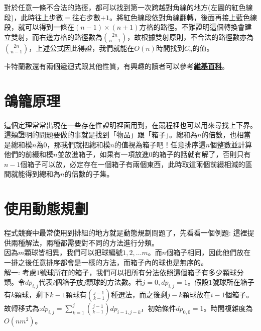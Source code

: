 \documentclass[main.tex]{subfiles}
\begin{document}
對於任意一條不合法的路徑，都可以找到第一次跨越對角線的地方(左圖的紅色線段)，此時往上步數$=$往右步數$+1$。將紅色線段依對角線翻轉，後面再接上藍色線段，就可以得到一條在$(n-1)\times(n+1)$方格的路徑。不難證明這個轉換會建立雙射，而右邊方格的路徑數為$\binom{2n}{n-1}$，故根據雙射原則，不合法的路徑數亦為$\binom{2n}{n-1}$，上述公式因此得證，我們就能在$O(n)$時間找到$C_n$的值。

卡特蘭數還有兩個遞迴式跟其他性質，有興趣的讀者可以參考\textbf{\href{https://en.wikipedia.org/wiki/Catalan_number}{維基百科}}。

\section{鴿籠原理}
這個定理常常出現在一些存在性證明裡面用到，在競程裡也可以用來尋找上下界。
\newpage
這類證明的問題要做的事就是找到「物品」跟「箱子」。總和為$n$的倍數，也相當是總和模$n$為$0$，那我們就把總和模$n$的值視為箱子吧！任意排序這$n$個整數並計算他們的前綴和模$n$並放進箱子，如果有一項放進$0$的箱子的話就有解了，否則只有$n-1$個箱子可以放，必定存在一個箱子有兩個東西，此時取這兩個前綴相減的區間就能得到總和為$n$的倍數的子集。


\section{使用動態規劃}
程式競賽中最常使用到排組的地方就是動態規劃問題了，先看看一個例題:
這裡提供兩種解法，兩種都需要對不同的方法進行分類。 \\
因為$m$顆球皆相異，我們可以把球編號$1, 2, \dots m$。而$n$個箱子相同，因此他們放在一排之後任意排序都會是一樣的方法，而箱子內的球也是無序的。 \\

解一: 考慮$1$號球所在的箱子，我們可以把所有分法依照這個箱子有多少顆球分類。令$dp_{i, j}$代表$i$個箱子放$j$顆球的方法數。若$j = 0, dp_{i, j} = 1$。假設$1$號球所在箱子有$k$顆球，剩下$k-1$顆球有$\binom{j-1}{k-1}$種選法，而之後剩$j-k$顆球放在$i-1$個箱子。故轉移式為:$dp_{i, j} = \sum_{k=1}^j \binom{j-1}{k-1} dp_{i-1, j-k}$，初始條件$dp_{0, 0} = 1$。時間複雜度為$O(nm^2)$。\\
\end{document}
